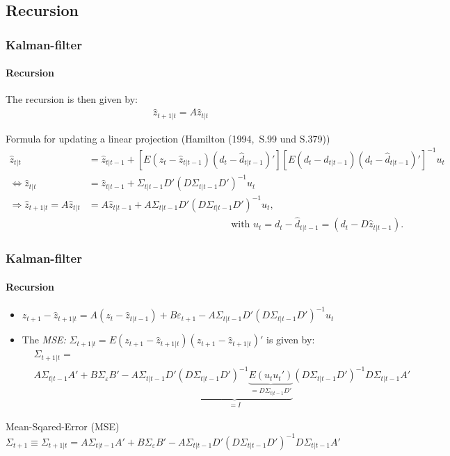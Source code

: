 \documentclass[handout]{beamer}  %
\begin{document}
\subsection{Recursion}
\begin{frame}\frametitle{Kalman-filter}\framesubtitle{Recursion}
The recursion is then given by:
\begin{align*} {\widehat{z}_{t+1|t}} = {A} {\widehat{z}_{t|t}} \end{align*}
\begin{block}{\scriptsize Formula for updating a linear projection (Hamilton (1994,~S.99 und S.379))}
\scriptsize\begin{align*}
  {\widehat{z}_{t|t}} &= {\widehat{z}_{t|t-1}}  +\left[E({z_t}-{\widehat{z}_{t|t-1}})({d_t}-{\widehat{d}_{t|t-1}})'\right] \left[E({d_t}-{\widehat{d}_{t|t-1}})({d_t}-{\widehat{d}_{t|t-1}})'\right]^{-1} {u_t}\\
 \Leftrightarrow {\widehat{z}_{t|t}}&= {\widehat{z}_{t|t-1}}+ {\Sigma_{t|t-1}} {D'} \left({D}{\Sigma_{t|t-1}}{D'}\right)^{-1} {u_t}\\
  \Rightarrow {\widehat{z}_{t+1|t}} = {A} {\widehat{z}_{t|t}} &={A} {\widehat{z}_{t|t-1}}+ {A}{\Sigma_{t|t-1}} {D'} \left({D}{\Sigma_{t|t-1}}{D'}\right)^{-1} {u_t}, \\
  &\qquad\qquad\qquad\qquad\qquad\qquad\qquad~~~ \text{with } {u_t} = {d_t} - {\widehat{d}_{t|t-1}} = ({d_t} - D{\widehat{z}_{t|t-1}}).
\end{align*}
\end{block}
\end{frame}

\begin{frame}\frametitle{Kalman-filter}\framesubtitle{Recursion}
\begin{itemize}
\item ${z_{t+1}} - {\widehat{z}_{t+1|t}} = {A}\left({z_{t}} - {\widehat{z}_{t|t-1}}\right) + {B} {\varepsilon_{t+1}} - {A}{\Sigma_{t|t-1}} {D'} \left({D}{\Sigma_{t|t-1}}{D'}\right)^{-1} {u_t}$
\item The \emph{MSE: } ${\Sigma_{t+1|t} }= E\left({z_{t+1}} - {\widehat{z}_{t+1|t}}\right)\left({z_{t+1}} - {\widehat{z}_{t+1|t}}\right)'$ is given by:
\scriptsize\begin{align*}
    &{\Sigma_{t+1|t} }=\\
    & {A} {\Sigma_{t|t-1}} {A'} + {B} {\Sigma_\varepsilon} {B}' - {A}{\Sigma_{t|t-1}} {D'} \underbrace{\left({D}{\Sigma_{t|t-1}}{D'}\right)^{-1} \underbrace{E({u_t} {u_t'})}_{={D} {\Sigma_{t|t-1}} {D'}}}_{={I}}
    \left({D}{\Sigma_{t|t-1}}{D'}\right)^{-1} {D} {\Sigma_{t|t-1}} {A}'
\end{align*}
\end{itemize}
\scriptsize\begin{block}{Mean-Sqared-Error (MSE)}\centering
$
{\Sigma_{t+1} } \equiv {\Sigma_{t+1|t} }      = {A} {\Sigma_{t|t-1}} {A'} + {B} {\Sigma_\varepsilon} {B}' - {A}{\Sigma_{t|t-1}} {D'} \left({D}{\Sigma_{t|t-1}}{D'}\right)^{-1} {D} {\Sigma_{t|t-1}}{A}'
$
\end{block}
\end{frame}
\end{document}
